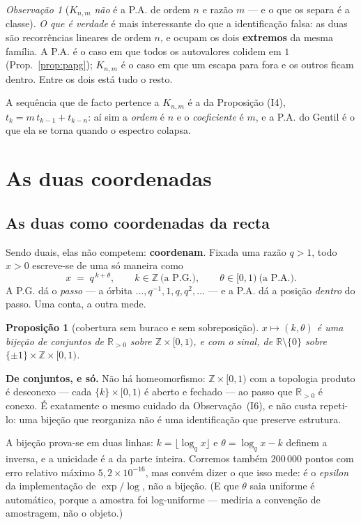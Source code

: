 \documentclass[11pt,a4paper]{article}
\theoremstyle{plain}
\newtheorem{proposicao}[teorema]{Proposição}
\theoremstyle{definition}
\theoremstyle{remark}
\newtheorem{obs}[teorema]{Observação}
\newcommand{\R}{\mathbb{R}}
\newcommand{\Z}{\mathbb{Z}}
\begin{document}
\begin{obs}[$K_{n,m}$ \emph{não} é a P.A. de ordem $n$ e razão $m$ --- e o que os separa é a classe]
\emph{O que é verdade} é mais interessante do que a identificação falsa: as duas são recorrências
lineares de ordem $n$, e ocupam os dois \textbf{extremos} da mesma família. A P.A. é o caso em que
todos os autovalores colidem em $1$ (Prop.~\ref{prop:papg}); $K_{n,m}$
é o caso em que um escapa para fora e os outros ficam dentro. Entre os dois está tudo o resto.

A sequência que de facto pertence a $K_{n,m}$ é a da Proposição (I4),
$t_k = m\,t_{k-1} + t_{k-n}$: aí sim a \emph{ordem} é $n$ e o \emph{coeficiente} é $m$, e a P.A.
do Gentil é o que ela se torna quando o espectro colapsa.
\end{obs}


\section{As duas coordenadas}\label{sec:coord}

\subsection{As duas como coordenadas da recta}\label{sec:duascoord}

Sendo duais, elas não competem: \textbf{coordenam}. Fixada uma razão $q>1$, todo $x>0$ escreve-se
de uma só maneira como
\[
  x \;=\; q^{\,k+\theta}, \qquad k\in\Z \ \text{(a P.G.)}, \qquad \theta\in[0,1) \ \text{(a P.A.)} .
\]
A P.G. dá o \emph{passo} --- a órbita $\dots,q^{-1},1,q,q^2,\dots$ --- e a P.A. dá a posição
\emph{dentro} do passo. Uma conta, a outra mede.

\begin{proposicao}[cobertura sem buraco e sem sobreposição]\label{prop:coord}
$x \mapsto (k,\theta)$ é uma bijeção \emph{de conjuntos} de $\R_{>0}$ sobre $\Z\times[0,1)$, e com
o sinal, de $\R\setminus\{0\}$ sobre $\{\pm1\}\times\Z\times[0,1)$.
\end{proposicao}

\noindent \textbf{De conjuntos, e só.} Não há homeomorfismo: $\Z\times[0,1)$ com a topologia
produto é desconexo --- cada $\{k\}\times[0,1)$ é aberto e fechado --- ao passo que $\R_{>0}$ é
conexo. É exatamente o mesmo cuidado da Observação~(I6), e não custa repeti-lo: uma
bijeção que reorganiza não é uma identificação que preserve estrutura.

\noindent A bijeção prova-se em duas linhas: $k = \lfloor \log_q x\rfloor$ e
$\theta = \log_q x - k$ definem a inversa, e a unicidade é a da parte inteira. Corremos também
$200\,000$ pontos com erro relativo máximo $5{,}2\times10^{-16}$, mas convém dizer o que isso mede:
é o \emph{epsilon} da implementação de $\exp/\log$, não a bijeção. (E que $\theta$ saia uniforme é
automático, porque a amostra foi log-uniforme --- mediria a convenção de amostragem, não o objeto.)
\end{document}
